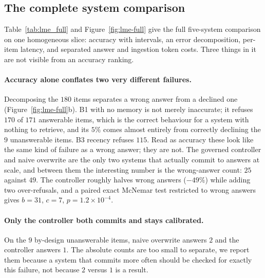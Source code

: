 \subsection{The complete system comparison}
\label{sec:downstream:full}

Table~\ref{tab:lme_full} and Figure~\ref{fig:lme-full} give the full
five-system comparison on one homogeneous slice: accuracy with intervals, an
error decomposition, per-item latency, and separated answer and ingestion token
costs. Three things in it are not visible from an accuracy ranking.

\paragraph{Accuracy alone conflates two very different failures.}
Decomposing the $180$ items separates a wrong answer from a declined one
(Figure~\ref{fig:lme-full}b). B1 with no memory is not merely inaccurate; it
refuses $170$ of $171$ answerable items, which is the correct behaviour for a
system with nothing to retrieve, and its $5\%$ comes almost entirely from
correctly declining the $9$ unanswerable items. B3 recency refuses $115$. Read as
accuracy these look like the same kind of failure as a wrong answer; they are
not. The governed controller and naive overwrite are the only two systems that
actually commit to answers at scale, and between them the interesting number is
the wrong-answer count: $25$ against $49$. The controller roughly halves wrong
answers ($-49\%$) while adding two over-refusals, and a paired exact McNemar
test restricted to wrong answers gives $b=31$, $c=7$,
$p = 1.2\times10^{-4}$.

\paragraph{Only the controller both commits and stays calibrated.}
On the $9$ by-design unanswerable items, naive overwrite answers $2$ and the
controller answers $1$. The absolute counts are too small to separate,
we report them because a system that commits more often should be checked for
exactly this failure, not because $2$ versus $1$ is a result.

